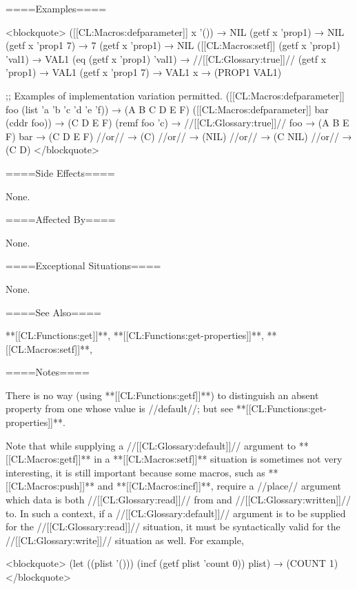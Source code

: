 ====Examples====

<blockquote> ([[CL:Macros:defparameter]] x '()) → NIL (getf x 'prop1) → NIL (getf x 'prop1 7) → 7 (getf x 'prop1) → NIL ([[CL:Macros:setf]] (getf x 'prop1) 'val1) → VAL1 (eq (getf x 'prop1) 'val1) → //[[CL:Glossary:true]]// (getf x 'prop1) → VAL1 (getf x 'prop1 7) → VAL1 x → (PROP1 VAL1)

;; Examples of implementation variation permitted. ([[CL:Macros:defparameter]] foo (list 'a 'b 'c 'd 'e 'f)) → (A B C D E F) ([[CL:Macros:defparameter]] bar (cddr foo)) → (C D E F) (remf foo 'c) → //[[CL:Glossary:true]]// foo → (A B E F) bar → (C D E F) //or// → (C) //or// → (NIL) //or// → (C NIL) //or// → (C D) </blockquote>


====Side Effects====

None.

====Affected By====

None.

====Exceptional Situations====

None.

====See Also====

**[[CL:Functions:get]]**, **[[CL:Functions:get-properties]]**, **[[CL:Macros:setf]]**, {\secref\FnFormsAsGenRefs}

====Notes====

There is no way (using **[[CL:Functions:getf]]**) to distinguish an absent property from one whose value is //default//; but see **[[CL:Functions:get-properties]]**.

Note that while supplying a //[[CL:Glossary:default]]// argument to **[[CL:Macros:getf]]** in a **[[CL:Macros:setf]]** situation is sometimes not very interesting, it is still important because some macros, such as **[[CL:Macros:push]]** and **[[CL:Macros:incf]]**, require a //place// argument which data is both //[[CL:Glossary:read]]// from and //[[CL:Glossary:written]]// to. In such a context, if a //[[CL:Glossary:default]]// argument is to be supplied for the //[[CL:Glossary:read]]// situation, it must be syntactically valid for the //[[CL:Glossary:write]]// situation as well. For example,

<blockquote> (let ((plist '())) (incf (getf plist 'count 0)) plist) → (COUNT 1) </blockquote>

    

